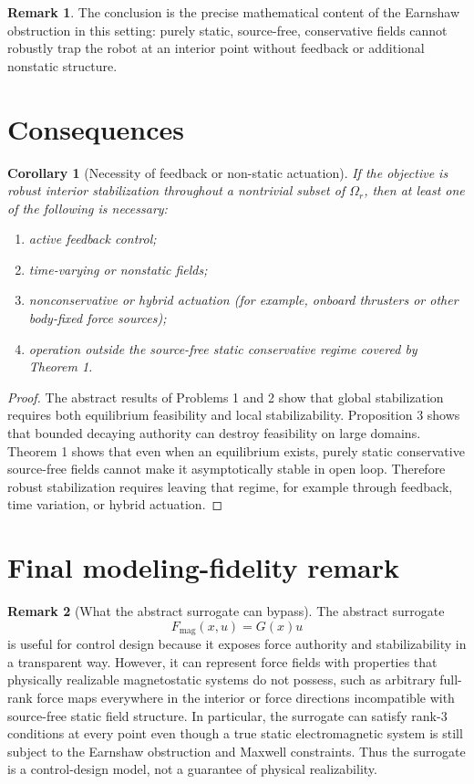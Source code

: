 \documentclass[11pt]{article}
\newtheorem{corollary}{Corollary}
\theoremstyle{definition}
\newtheorem{remark}{Remark}
\begin{document}
\begin{remark}
The conclusion is the precise mathematical content of the Earnshaw obstruction in this setting: purely static, source-free, conservative fields cannot robustly trap the robot at an interior point without feedback or additional nonstatic structure.
\end{remark}

\section{Consequences}

\begin{corollary}[Necessity of feedback or non-static actuation]
If the objective is robust interior stabilization throughout a nontrivial subset of $\Omega_r$, then at least one of the following is necessary:
\begin{enumerate}[label=(\roman*), leftmargin=1.5em]
    \item active feedback control;
    \item time-varying or nonstatic fields;
    \item nonconservative or hybrid actuation (for example, onboard thrusters or other body-fixed force sources);
    \item operation outside the source-free static conservative regime covered by Theorem 1.
\end{enumerate}
\end{corollary}

\begin{proof}
The abstract results of Problems 1 and 2 show that global stabilization requires both equilibrium feasibility and local stabilizability. Proposition 3 shows that bounded decaying authority can destroy feasibility on large domains. Theorem 1 shows that even when an equilibrium exists, purely static conservative source-free fields cannot make it asymptotically stable in open loop. Therefore robust stabilization requires leaving that regime, for example through feedback, time variation, or hybrid actuation.
\end{proof}

\section{Final modeling-fidelity remark}

\begin{remark}[What the abstract surrogate can bypass]
The abstract surrogate
\[
F_{\mathrm{mag}}(x,u)=G(x)u
\]
is useful for control design because it exposes force authority and stabilizability in a transparent way. However, it can represent force fields with properties that physically realizable magnetostatic systems do not possess, such as arbitrary full-rank force maps everywhere in the interior or force directions incompatible with source-free static field structure. In particular, the surrogate can satisfy rank-$3$ conditions at every point even though a true static electromagnetic system is still subject to the Earnshaw obstruction and Maxwell constraints. Thus the surrogate is a control-design model, not a guarantee of physical realizability.
\end{remark}
\end{document}

